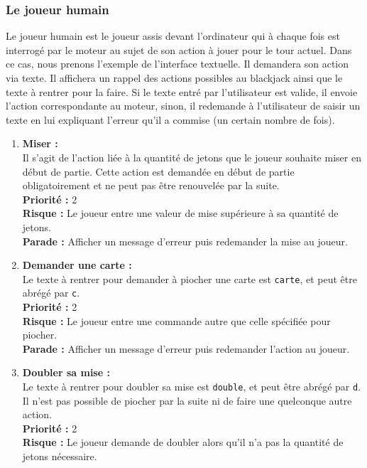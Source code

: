 \documentclass{article}
\newcommand{\code}[1]{\colorbox{light-gray}{\texttt{#1}}}
\begin{document}
\subsubsection{Le joueur humain}

Le joueur humain est le joueur assis devant l'ordinateur qui à chaque fois est interrogé par le moteur au sujet de son action à jouer pour le tour actuel. Dans ce cas, nous prenons l'exemple de l'interface textuelle. Il demandera son action via texte. Il affichera un rappel des actions possibles au blackjack ainsi que le texte à rentrer pour la faire. Si le texte entré par l'utilisateur est valide, il envoie l'action correspondante au moteur, sinon, il redemande à l'utilisateur de saisir un texte en lui expliquant l'erreur qu'il a commise (un certain nombre de fois). 
\begin{enumerate}
    \item \textbf {Miser :} \\
    Il s'agit de l'action liée à la quantité de jetons que le joueur souhaite miser en début de partie. Cette action est demandée en début de partie obligatoirement et ne peut pas être renouvelée par la suite. \\
    \textbf{Priorité :} 2 \\
    \textbf{Risque :} Le joueur entre une valeur de mise supérieure à sa quantité de jetons. \\
    \textbf{Parade :} Afficher un message d'erreur puis redemander la mise au joueur.\\
    \item \textbf {Demander une carte :} \\
    Le texte à rentrer pour demander à piocher une carte est \code{carte}, et peut être abrégé par \code{c}. \\
    \textbf{Priorité :} 2 \\
    \textbf{Risque :} Le joueur entre une commande autre que celle spécifiée pour piocher. \\
    \textbf{Parade :} Afficher un message d'erreur puis redemander l'action au joueur.\\
    \item \textbf {Doubler sa mise :} \\
    Le texte à rentrer pour doubler sa mise est \code{double}, et peut être abrégé par \code{d}.
    Il n'est pas possible de piocher par la suite ni de faire une quelconque autre action. \\
    \textbf{Priorité :} 2 \\
    \textbf{Risque :} Le joueur demande de doubler alors qu'il n'a pas la quantité de jetons nécessaire.  \\

\end{enumerate}
\end{document}
